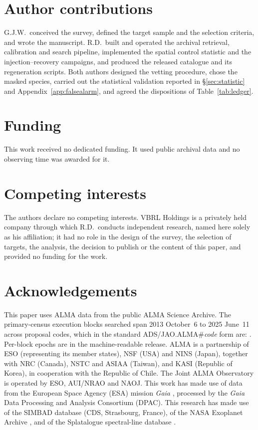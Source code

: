 \section*{Author contributions}
G.J.W.\ conceived the survey, defined the target sample and the selection
criteria, and wrote the manuscript. R.D.\ built and operated the archival
retrieval, calibration and search pipeline, implemented the spatial control
statistic and the injection--recovery campaigns, and produced the released
catalogue and its regeneration scripts. Both authors designed the vetting
procedure, chose the masked species, carried out the statistical
validation reported in \S\ref{sec:statistic} and
Appendix~\ref{app:falsealarm}, and agreed the dispositions of
Table~\ref{tab:ledger}.

\section*{Funding}
This work received no dedicated funding. It used public archival data and
no observing time was awarded for it.

\section*{Competing interests}
The authors declare no competing interests. VBRL Holdings is a privately
held company through which R.D.\ conducts independent research, named
here solely as his affiliation; it had no role in the design of the
survey, the selection of targets, the analysis, the decision to publish
or the content of this paper, and provided no funding for the work.

\section*{Acknowledgements}
This paper uses ALMA data from the public ALMA Science Archive. The \NEB{}
primary-census execution blocks searched span 2013 October~6 to 2025
June~11 across \NProjCodes{} proposal codes, which in the standard
ADS/JAO.ALMA\#\textit{code} form are:
\unskip. Per-block epochs are in the machine-readable release.\ProjCodeUnresClause{} ALMA is a partnership of ESO
(representing its member states), NSF (USA) and NINS (Japan), together with NRC
(Canada), NSTC and ASIAA (Taiwan), and KASI (Republic of Korea), in cooperation
with the Republic of Chile. The Joint ALMA Observatory is operated by ESO,
AUI/NRAO and NAOJ. This work has made use of data from the European Space
Agency (ESA) mission {\it Gaia} \citep{GaiaDR3}, processed by the {\it Gaia}
Data Processing and Analysis Consortium (DPAC). This research has made use
of the SIMBAD database (CDS, Strasbourg, France), of the NASA Exoplanet
Archive \citep{NEA2013}, and of the Splatalogue spectral-line database
\citep{Splatalogue2007}.

